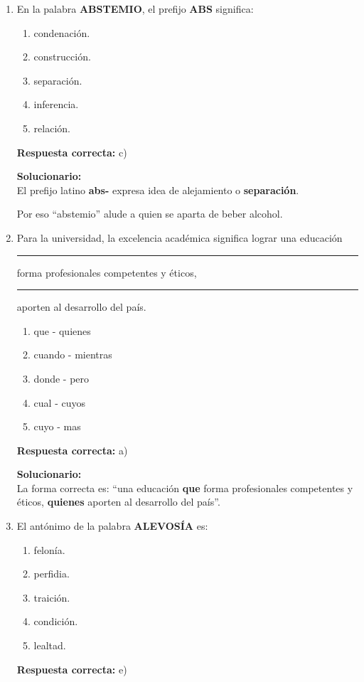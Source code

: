 \begin{enumerate}

	
	\item En la palabra \textbf{ABSTEMIO}, el prefijo \textbf{ABS} significa:
	\begin{enumerate}[label=\alph*)]
		\item condenación.
		\item construcción.
		\item separación.
		\item inferencia.
		\item relación.
	\end{enumerate}
	\textbf{Respuesta correcta:} c)
	
	\vspace{2mm}
	\textbf{Solucionario:}\\
	El prefijo latino \textbf{abs-} expresa idea de alejamiento o \textbf{separación}.
	
	Por eso ``abstemio'' alude a quien se aparta de beber alcohol.
	

	
	\vspace{6mm}
	
	\item Para la universidad, la excelencia académica significa lograr una educación \rule{1cm}{0.15mm} forma profesionales competentes y éticos, \rule{1cm}{0.15mm} aporten al desarrollo del país.
	\begin{enumerate}[label=\alph*)]
		\item que - quienes
		\item cuando - mientras
		\item donde - pero
		\item cual - cuyos
		\item cuyo - mas
	\end{enumerate}
	\textbf{Respuesta correcta:} a)
	
	\vspace{2mm}
	\textbf{Solucionario:}\\
	La forma correcta es: ``una educación \textbf{que} forma profesionales competentes y éticos, \textbf{quienes} aporten al desarrollo del país''.
	

	
	\vspace{6mm}
	
	\item El antónimo de la palabra \textbf{ALEVOSÍA} es:
	\begin{enumerate}[label=\alph*)]
		\item felonía.
		\item perfidia.
		\item traición.
		\item condición.
		\item lealtad.
	\end{enumerate}
	\textbf{Respuesta correcta:} e)
	

\end{enumerate}
